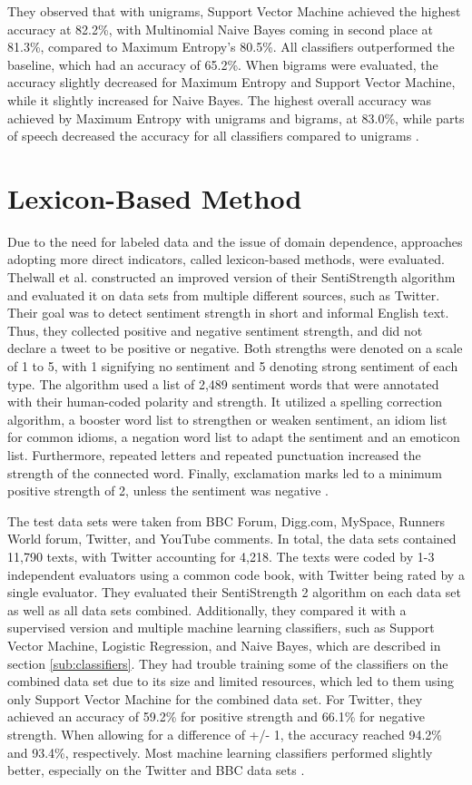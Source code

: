 They observed that with unigrams, Support Vector Machine achieved the highest accuracy at 82.2\%, with Multinomial Naive Bayes coming in second place at 81.3\%, compared to Maximum Entropy's 80.5\%. All classifiers outperformed the baseline, which had an accuracy of 65.2\%. When bigrams were evaluated, the accuracy slightly decreased for Maximum Entropy and Support Vector Machine, while it slightly increased for Naive Bayes. The highest overall accuracy was achieved by Maximum Entropy with unigrams and bigrams, at 83.0\%, while parts of speech decreased the accuracy for all classifiers compared to unigrams \cite{GoBHaHua2009}. 

\section{Lexicon-Based Method}
\label{sub:related_lexicon}

Due to the need for labeled data and the issue of domain dependence, approaches adopting more direct indicators, called lexicon-based methods, were evaluated. Thelwall et al. constructed an improved version of their SentiStrength algorithm and evaluated it on data sets from multiple different sources, such as Twitter. Their goal was to detect sentiment strength in short and informal English text. Thus, they collected positive and negative sentiment strength, and did not declare a tweet to be positive or negative. Both strengths were denoted on a scale of 1 to 5, with 1 signifying no sentiment and 5 denoting strong sentiment of each type. The algorithm used a list of 2,489 sentiment words that were annotated with their human-coded polarity and strength. It utilized a spelling correction algorithm, a booster word list to strengthen or weaken sentiment, an idiom list for common idioms, a negation word list to adapt the sentiment and an emoticon list. Furthermore, repeated letters and repeated punctuation increased the strength of the connected word. Finally, exclamation marks led to a minimum positive strength of 2, unless the sentiment was negative \cite{10.1002/asi.21662}.

The test data sets were taken from BBC Forum, Digg.com, MySpace, Runners World forum, Twitter, and YouTube comments. In total, the data sets contained 11,790 texts, with Twitter accounting for 4,218. The texts were coded by 1-3 independent evaluators using a common code book, with Twitter being rated by a single evaluator. They evaluated their SentiStrength 2 algorithm on each data set as well as all data sets combined. Additionally, they compared it with a supervised version and multiple machine learning classifiers, such as Support Vector Machine, Logistic Regression, and Naive Bayes, which are described in section \ref{sub:classifiers}. They had trouble training some of the classifiers on the combined data set due to its size and limited resources, which led to them using only Support Vector Machine for the combined data set. For Twitter, they achieved an accuracy of 59.2\% for positive strength and 66.1\% for negative strength. When allowing for a difference of +/- 1, the accuracy reached 94.2\% and 93.4\%, respectively. Most machine learning classifiers performed slightly better, especially on the Twitter and BBC data sets \cite{10.1002/asi.21662}.

